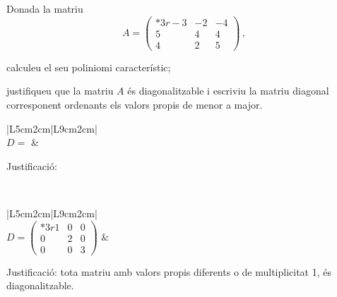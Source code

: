\documentclass[10pt,catalan]{article}
\begin{document}
\begin{enunciat}
Donada la matriu
\[
   A=\begin{pmatrix}{*{3}r} -3 & -2 & -4\\ 5 & 4 & 4\\ 4 & 2 & 5\end{pmatrix}\,,
\]
\begin{apartats}
\item calculeu el seu poliniomi característic;
\item justifiqueu que la matriu $A$ és diagonalitzable i escriviu la matriu diagonal corresponent  ordenants els valors propis de menor a major.
\end{apartats}
\end{enunciat}

\begin{quadricula}
\begin{tabular}{|L{5cm}{2cm}|L{9cm}{2cm}|}
\hline
{} \\
\hline
$D=$ & \begin{minipage}[t]{8.8cm}Justificació:\vspace{1.8cm} \end{minipage}\\
\hline
\end{tabular}
\end{quadricula}

\begin{solucio}
\begin{center}
\begin{tabular}{|L{5cm}{2cm}|L{9cm}{2cm}|}
\hline
{} \\
\hline
$D=\begin{pmatrix}{*{3}r} 1 & 0 & 0\\ 0 & 2 & 0\\ 0 & 0 & 3\end{pmatrix}$ & 
\begin{minipage}[t]{8.8cm}
Justificació: tota matriu amb valors propis diferents o de multiplicitat 1, és diagonalitzable.
\vspace{1cm}
\end{minipage} \\
\hline
\end{tabular}
\end{center}
\end{solucio}
\end{document}
